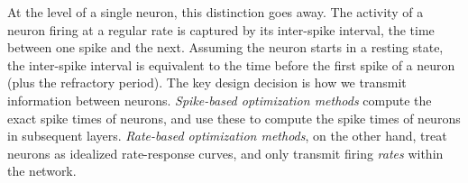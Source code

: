 At the level of a single neuron, this distinction goes away.
The activity of a neuron firing at a regular rate
is captured by its inter-spike interval,
the time between one spike and the next.
Assuming the neuron starts in a resting state,
the inter-spike interval is equivalent
to the time before the first spike of a neuron (plus the refractory period).
The key design decision is how we transmit information between neurons.
\emph{Spike-based optimization methods}
compute the exact spike times of neurons,
and use these to compute the spike times of neurons in subsequent layers.
\emph{Rate-based optimization methods}, on the other hand,
treat neurons as idealized rate-response curves,
and only transmit firing \emph{rates} within the network.


